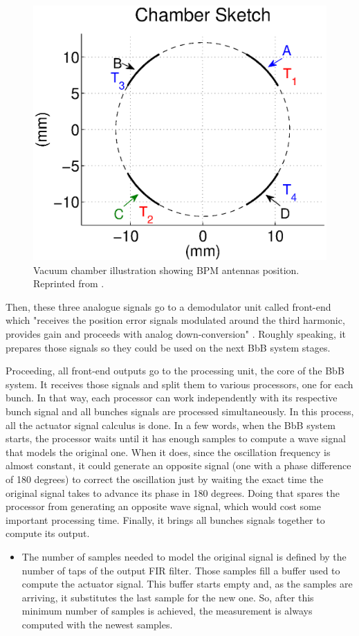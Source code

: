 \begin{figure}[!htb]
	\centering
	\includegraphics[width=0.7\linewidth]{./Figures/BPMsketch.eps}
	\caption{Vacuum chamber illustration showing BPM antennas position. Reprinted from \cite{digBPMCalculation}.}
	\label{fig:BPMsketch}
\end{figure}

Then, these three analogue signals go to a demodulator unit called front-end which "receives the position error signals modulated around the third harmonic, provides gain and proceeds with analog down-conversion" \cite{digBPMCalculation}. Roughly speaking, it prepares those signals so they could be used on the next BbB system stages.

Proceeding, all front-end outputs go to the processing unit, the core of the BbB system. It receives those signals and split them to various processors, one for each bunch. In that way, each processor can work independently with its respective bunch signal and all bunches signals are processed simultaneously. In this process, all the actuator signal calculus is done. In a few words, when the BbB system starts, the processor waits until it has enough samples to compute a wave signal that models the original one. When it does, since the oscillation frequency is almost constant, it could generate an opposite signal (one with a phase difference of 180 degrees) to correct the oscillation just by waiting the exact time the original signal takes to advance its phase in 180 degrees. Doing that spares the processor from generating an opposite wave signal, which would cost some important processing time. Finally, it brings all bunches signals together to compute its output.

\begin{itemize}
	\item The number of samples needed to model the original signal is defined by the number of taps of the output FIR filter. Those samples fill a buffer used to compute the actuator signal. This buffer starts empty and, as the samples are arriving, it substitutes the last sample for the new one. So, after this minimum number of samples is achieved, the measurement is always computed with the newest samples.
\end{itemize}

